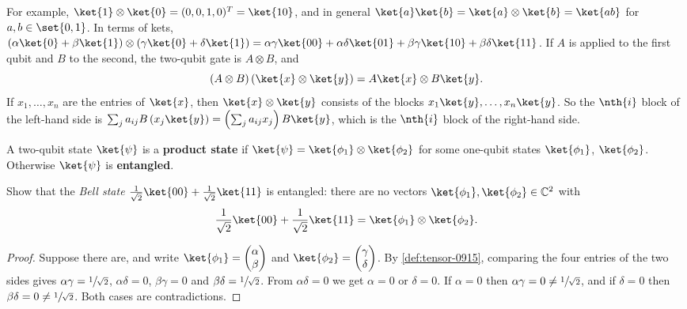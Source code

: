 For example, $\ket{1} \otimes \ket{0} = (0, 0, 1, 0)^T = \ket{10}$, and
in general $\ket{a} \ket{b} = \ket{a} \otimes \ket{b} = \ket{a b}$ for $a, b \in \set{0,1}$. In terms
of kets, $\left(\alpha \ket{0} + \beta \ket{1}\right) \otimes \left(\gamma \ket{0} + \delta \ket{1}\right)
    = \alpha\gamma \ket{00} + \alpha\delta \ket{01} + \beta\gamma \ket{10} + \beta\delta \ket{11}$.
If $A$ is applied to the first qubit and $B$ to the second, the two-qubit gate is $A \otimes B$, and
\begin{equation}\label{eq:mixed-0915}
    (A \otimes B)\left(\ket{x} \otimes \ket{y}\right) = A \ket{x} \otimes B \ket{y}.
\end{equation}
If $x_1, \dots, x_n$ are the entries of $\ket{x}$, then $\ket{x} \otimes \ket{y}$ consists of
the blocks $x_1 \ket{y}, \dots, x_n \ket{y}$. So the $\nth{i}$ block of the left-hand side is
$\sum_{j} a_{ij} B \left(x_j \ket{y}\right) = \left(\sum_j a_{ij} x_j\right) B \ket{y}$, which is the
$\nth{i}$ block of the right-hand side.

\begin{definition}
    A two-qubit state $\ket{\psi}$ is a \textbf{product state} if
    $\ket{\psi} = \ket{\phi_1} \otimes \ket{\phi_2}$ for some one-qubit states $\ket{\phi_1}$,
    $\ket{\phi_2}$. Otherwise $\ket{\psi}$ is \textbf{entangled}.
\end{definition}

\begin{exercisebox}
\begin{exercise}\label{ex:bell-0915}\label{thm:bell-0915}
    Show that the \emph{Bell state} $\frac{1}{\sqrt{2}} \ket{00} + \frac{1}{\sqrt{2}} \ket{11}$ is
    entangled: there are no vectors $\ket{\phi_1}, \ket{\phi_2} \in \mathbb{C}^2$ with
    \[\frac{1}{\sqrt{2}} \ket{00} + \frac{1}{\sqrt{2}} \ket{11} = \ket{\phi_1} \otimes \ket{\phi_2}.\]
\end{exercise}
\tcblower
\begin{proof}
    Suppose there are, and write $\ket{\phi_1} = \begin{pmatrix} \alpha \\ \beta \end{pmatrix}$ and
    $\ket{\phi_2} = \begin{pmatrix} \gamma \\ \delta \end{pmatrix}$. By \cref{def:tensor-0915},
    comparing the four entries of the two sides gives $\alpha\gamma = \sfrac{1}{\sqrt{2}}$,
    $\alpha\delta = 0$, $\beta\gamma = 0$ and $\beta\delta = \sfrac{1}{\sqrt{2}}$.
    From $\alpha\delta = 0$ we get $\alpha = 0$ or $\delta = 0$. If $\alpha = 0$ then
    $\alpha\gamma = 0 \neq \sfrac{1}{\sqrt{2}}$, and if $\delta = 0$ then
    $\beta\delta = 0 \neq \sfrac{1}{\sqrt{2}}$. Both cases are contradictions.
\end{proof}
\end{exercisebox}

